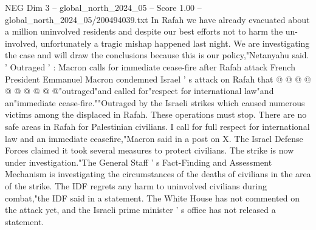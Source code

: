 \begin{textsample}{NEG Dim 3 – global\_north\_2024\_05 – Score 1.00 – global\_north\_2024\_05/200494039.txt}
In Rafah we have already evacuated about a million uninvolved residents and despite our best efforts not to harm the un-involved, unfortunately a tragic mishap happened last night.
We are investigating the case and will draw the conclusions because this is our policy,"Netanyahu said. ' Outraged ' : Macron calls for immediate cease-fire after Rafah attack French President Emmanuel Macron condemned Israel ' s attack on Rafah that @ @ @ @ @ @ @ @ @ @"outraged"and called for"respect for international law"and an"immediate cease-fire.""Outraged by the Israeli strikes which caused numerous victims among the displaced in Rafah.
These operations must stop.
There are no safe areas in Rafah for Palestinian civilians.
I call for full respect for international law and an immediate ceasefire,"Macron said in a post on X.
The Israel Defense Forces claimed it took several measures to protect civilians.
The strike is now under investigation."The General Staff ' s Fact-Finding and Assessment Mechanism is investigating the circumstances of the deaths of civilians in the area of the strike.
The IDF regrets any harm to uninvolved civilians during combat,"the IDF said in a statement.
The White House has not commented on the attack yet, and the Israeli prime minister ' s office has not released a statement.

\end{textsample}
